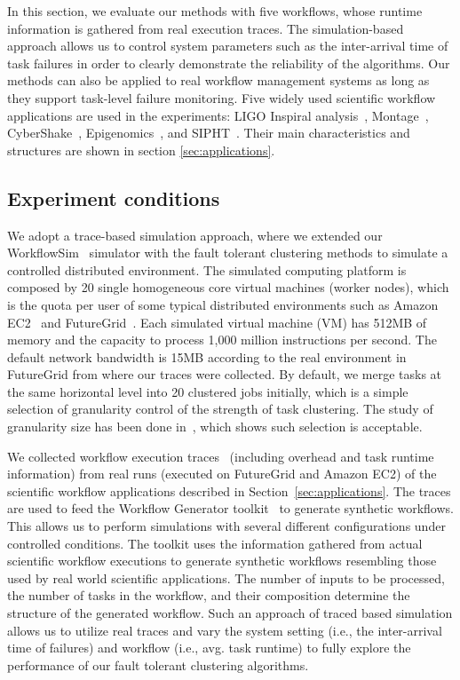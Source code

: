 In this section, we evaluate our methods with five workflows, whose runtime information is gathered from real execution traces. The simulation-based approach allows us to control system parameters such as the inter-arrival time of task failures in order to clearly demonstrate the reliability of the algorithms. Our methods can also be applied to real workflow management systems as long as they support task-level failure monitoring. 
Five widely used scientific workflow applications are used in the experiments: LIGO Inspiral analysis~\cite{LIGO}, Montage~\cite{Berriman2004}, CyberShake~\cite{Graves2010}, Epigenomics~\cite{Epigenome}, and SIPHT~\cite{SIPHT}. Their main characteristics and structures are shown in section \ref{sec:applications}. 




\subsection{Experiment conditions}
\label{sec:tolerance:experiment_conditions}
We adopt a trace-based simulation approach, where we extended our WorkflowSim~\cite{WorkflowSim} simulator with the fault tolerant clustering methods to simulate a controlled distributed environment. 
The simulated computing platform is composed by 20 single homogeneous core virtual machines (worker nodes), which is the quota per user of some typical distributed environments such as Amazon EC2~\cite{AmazonAWS} and FutureGrid~\cite{Fox2013FutureGrid}. Each simulated virtual machine (VM) has 512MB of memory and the capacity to process 1,000 million instructions per second. The default network bandwidth is 15MB according to the real environment in FutureGrid from where our traces were collected. By default, we merge tasks at the same horizontal level into 20 clustered jobs initially, which is a simple selection of granularity control of the strength of task clustering. The study of granularity size has been done in~\cite{Chen2013b}, which shows such selection is acceptable.

We collected workflow execution traces~\cite{Juve2013, Chen2011} (including overhead and task runtime information) from real runs (executed on FutureGrid and Amazon EC2) of the scientific workflow applications described in Section~\ref{sec:applications}. The traces are used to feed the Workflow Generator toolkit~\cite{WorkflowGenerator} to generate synthetic workflows. This allows us to perform simulations with several different configurations under controlled conditions. The toolkit uses the information gathered from actual scientific workflow executions to generate synthetic workflows resembling those used by real world scientific applications. The number of inputs to be processed, the number of tasks in the workflow, and their composition determine the structure of the generated workflow. Such an approach of traced based simulation allows us to utilize real traces and vary the system setting (i.e., the inter-arrival time of failures) and workflow (i.e., avg. task runtime) to fully explore the performance of our fault tolerant clustering algorithms. 

